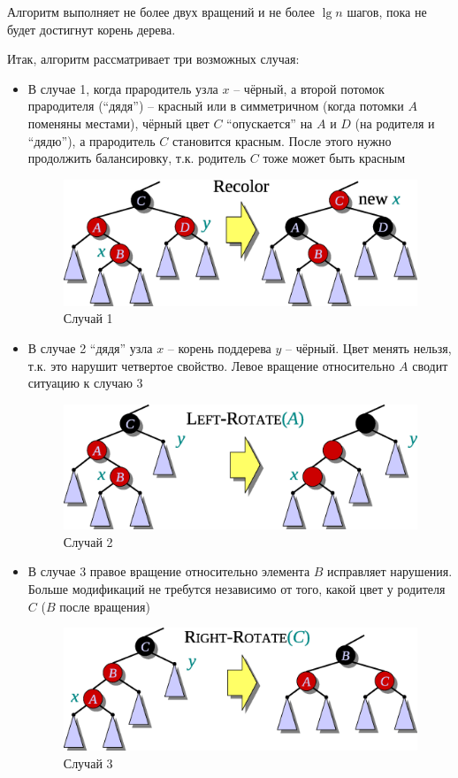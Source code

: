 \documentclass[11pt]{article}
\begin{document}
Алгоритм выполняет не более двух вращений и не более $\lg n$ шагов, пока не будет достигнут корень дерева.

Итак, алгоритм рассматривает три возможных случая:
\begin{itemize}
\item В случае 1, когда прародитель узла $x$ -- чёрный, а второй потомок прародителя (``дядя'') -- красный или в симметричном (когда потомки $A$ поменяны местами), чёрный цвет $C$ ``опускается'' на $A$ и $D$ (на родителя и ``дядю''), а прародитель $C$ становится красным. После этого нужно продолжить балансировку, т.к. родитель $C$ тоже может быть красным
\begin{figure}[h!]
  \centering
  \includegraphics[width=4.5in]{lecture10/case1.eps}
  \caption{Случай 1}
  \label{fig:case1}
\end{figure}
\item В случае 2 ``дядя'' узла $x$ -- корень поддерева $y$ -- чёрный. Цвет менять нельзя, т.к. это нарушит четвертое свойство. Левое вращение относительно $A$ сводит ситуацию к случаю 3
\begin{figure}[h!]
  \centering
  \includegraphics[width=4.5in]{lecture10/case2.eps}
  \caption{Случай 2}
  \label{fig:case2}
\end{figure}
\item В случае 3 правое вращение относительно элемента $B$ исправляет нарушения. Больше модификаций не требутся независимо от того, какой цвет у родителя $C$ ($B$ после вращения)
\begin{figure}[h!]
  \centering
  \includegraphics[width=4.5in]{lecture10/case3.eps}
  \caption{Случай 3}
  \label{fig:case3}
\end{figure}
\end{itemize}
\end{document}

